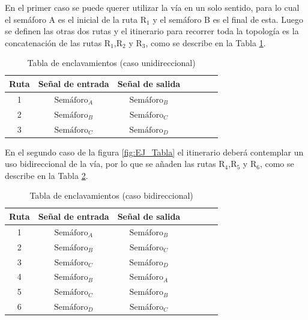 	En el primer caso se puede querer utilizar la vía en un solo sentido, para lo cual el semáforo A es el inicial de la ruta $\text{R}_1$ y el semáforo B es el final de esta. Luego se definen las otras dos rutas y el itinerario para recorrer toda la topología es la concatenación de las rutas $\text{R}_1$,$\text{R}_2$ y $\text{R}_3$, como se describe en la Tabla \ref{Tabla_simple}.
	
	\begin{table}[!hbt]
	\renewcommand{\arraystretch}{1.3}

	\caption{Tabla de enclavamientos (caso unidireccional)}
	\label{Tabla_simple}
	\centering

	\begin{tabular}{c c c c c c c}
	\hline
	Ruta & Señal de entrada & Señal de salida \\
	\hline
	 1 & $\text{Semáforo}_A$  & $\text{Semáforo}_B$ \\
	 2 & $\text{Semáforo}_B$  & $\text{Semáforo}_C$ \\
	 3 & $\text{Semáforo}_C$  & $\text{Semáforo}_D$ \\
	\hline
	\end{tabular}
	\end{table}
	
	En el segundo caso de la figura \ref{fig:EJ_Tabla} el itinerario deberá contemplar un uso bidireccional de la vía, por lo que se añaden las rutas $\text{R}_4$,$\text{R}_5$ y $\text{R}_6$, como se describe en la Tabla \ref{Tabla_bidireccional}.
	
	\begin{table}[!hbt]
	\renewcommand{\arraystretch}{1.3}

	\caption{Tabla de enclavamientos (caso bidireccional)}
	\label{Tabla_bidireccional}
	\centering

	\begin{tabular}{c c c c c c c}
	\hline
	Ruta & Señal de entrada & Señal de salida \\
	\hline
	 1 & $\text{Semáforo}_A$  & $\text{Semáforo}_B$ \\
	 2 & $\text{Semáforo}_B$  & $\text{Semáforo}_C$ \\
	 3 & $\text{Semáforo}_C$  & $\text{Semáforo}_D$ \\
	 4 & $\text{Semáforo}_B$  & $\text{Semáforo}_A$ \\
	 5 & $\text{Semáforo}_C$  & $\text{Semáforo}_B$ \\
	 6 & $\text{Semáforo}_D$  & $\text{Semáforo}_C$ \\
	\hline
	\end{tabular}
	\end{table}
	
